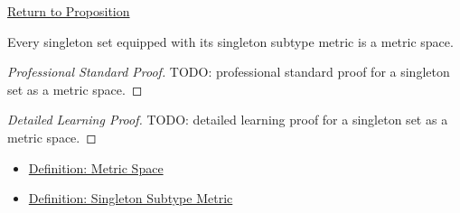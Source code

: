 \newpage
{}
\label{prf:singleton-set-metric-space}

\begin{remark*}[Return]
\hyperref[prop:singleton-set-metric-space]{Return to Proposition}
\end{remark*}

\begin{proposition*}
Every singleton set equipped with its singleton subtype metric is a metric
space.
\end{proposition*}

\begin{proof}[Professional Standard Proof]
\LRAProofBodyStart
TODO: professional standard proof for a singleton set as a metric space.
\end{proof}

\begin{proof}[Detailed Learning Proof]
\LRAProofBodyStart
TODO: detailed learning proof for a singleton set as a metric space.
\end{proof}

\begin{remark*}
\end{remark*}

\begin{dependencies}
\begin{itemize}
  \item \hyperref[def:metric-space]{Definition: Metric Space}
  \item \hyperref[def:singleton-subtype-metric]{Definition: Singleton Subtype Metric}
\end{itemize}
\end{dependencies}

\clearpage
